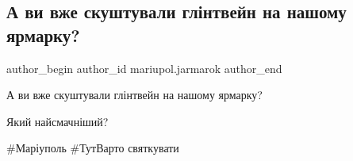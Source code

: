  
 
 
 
 

\subsection{А ви вже скуштували глінтвейн на нашому ярмарку?}
\label{sec:27_12_2021.fb.mariupol.jarmarok.1.glintvejn}

\ifcmt
 author_begin
   author_id mariupol.jarmarok
 author_end
\fi

А ви вже скуштували глінтвейн на нашому ярмарку? 

Який найсмачніший?

\#Маріуполь \#ТутВарто святкувати
